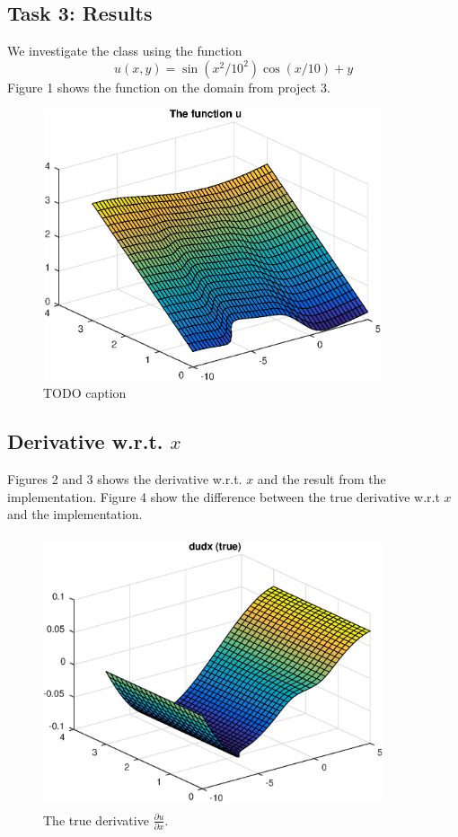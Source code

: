 \documentclass[a4paper,10pt]{article}
\begin{document}
\subsection*{Task 3: Results}
We investigate the class using the function
\begin{equation*}
  u(x,y) = \sin (x^2/10^2) \cos (x/10) + y
\end{equation*}
Figure 1 shows the function on the domain from project 3.
\begin{figure}[ht!]
  \centering
  \includegraphics[width = 10cm, height = 8cm]{ufctn}
  \begin{minipage}[t]{100mm}
    \caption{
      TODO caption
    }\label{FIG_jjj}
  \end{minipage}
\end{figure}

\subsection*{Derivative w.r.t. $x$}

Figures 2 and 3 shows the derivative w.r.t. $x$ and the result from the implementation.
Figure 4 show the difference between the true derivative w.r.t $x$ and the implementation.



\begin{figure}[ht]
  \centering
  \includegraphics[width = 10cm, height = 8cm]{dudx}
  \begin{minipage}[t]{100mm}
    \caption{
      The true derivative $\tfrac{\partial u}{\partial x}$.
    }\label{FIG_jjj}
  \end{minipage}
\end{figure}
\end{document}
